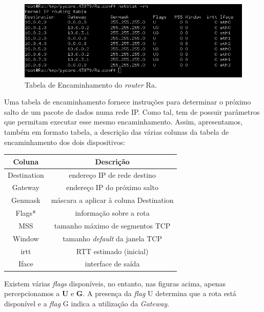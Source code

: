     \begin{figure}[H]
    \centering
    \includegraphics[width=450pt]{images/ParteII/Questao2/parteII-questao2-a-RA.jpg}
    \caption{Tabela de Encaminhamento do \textit{router} Ra.} \label{parteII-questao2-a-tabelaRa}
    \end{figure} 
        
    \par Uma tabela de encaminhamento fornece instruções para determinar o próximo salto de um pacote de dados numa rede IP. Como tal, tem de possuir parâmetros que permitam executar esse mesmo encaminhamento. Assim, apresentamos, também em formato tabela, a descrição das várias colunas da tabela de encaminhamento dos dois dispositivos:
    
    \begin{center}
        \begin{tabular}{|c|c|}
        \hline
            \cline{1-2}
            Coluna & Descrição  \\
            \hline \hline
            Destination & endereço IP de rede destino \\
            Gateway & endereço IP do próximo salto \\
            Genmask & máscara a aplicar à coluna Destination \\
            Flags* & informação sobre a rota \\
            MSS & tamanho máximo de segmentos TCP \\
            Window & tamanho \textit{default} da janela TCP \\
            irtt & RTT estimado (inicial) \\
            Iface & interface de saída \\
            \cline{1-2}
        \end{tabular}
    \end{center}
    
    \par * Existem várias \textit{flags} disponíveis, no entanto, nas figuras acima, apenas percepcionamos a \textbf{U} e \textbf{G}. A presença da \textit{flag} U determina que a rota está disponível e a \textit{flag} G indica a utilização da \textit{Gateway}.
    
